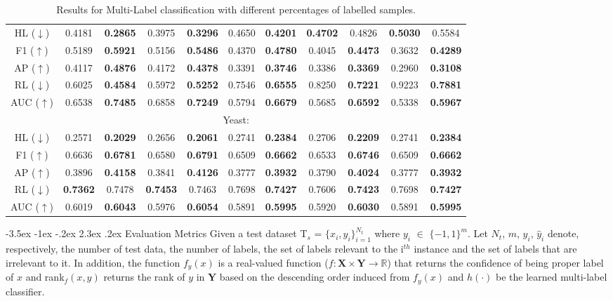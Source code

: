 \documentclass[12pt,a4paper,oneside,english]{report}
\makeatletter
\renewcommand\subsection{\@startsection {subsection}{1}{\z@}%
                                   {-3.5ex \@plus -1ex \@minus -.2ex}%
                                   {2.3ex \@plus.2ex}%
                                   {\centering\normalfont\Large\bfseries}}
\makeatother
\begin{document}
\begin{table}[htbp]
\begin{tabular}{|c|cc|cc|cc|cc|cc|}
\hline
HL ($\downarrow$) & 0.4181 & \textbf{0.2865} & 0.3975 & \textbf{0.3296} & 0.4650 & \textbf{0.4201} & \textbf{0.4702} & 0.4826 & \textbf{0.5030} & 0.5584 \\
F1 ($\uparrow$) & 0.5189 & \textbf{0.5921} & 0.5156 & \textbf{0.5486} & 0.4370 & \textbf{0.4780} & 0.4045 & \textbf{0.4473} & 0.3632 & \textbf{0.4289} \\
AP ($\uparrow$) & 0.4117 & \textbf{0.4876} & 0.4172 & \textbf{0.4378} & 0.3391 & \textbf{0.3746} & 0.3386 & \textbf{0.3369} & 0.2960 & \textbf{0.3108} \\
RL ($\downarrow$) & 0.6025 & \textbf{0.4584} & 0.5972 & \textbf{0.5252} & 0.7546 & \textbf{0.6555} & 0.8250 & \textbf{0.7221} & 0.9223 & \textbf{0.7881} \\
AUC ($\uparrow$) & 0.6538 & \textbf{0.7485} & 0.6858 & \textbf{0.7249} & 0.5794 & \textbf{0.6679} & 0.5685 & \textbf{0.6592} & 0.5338 & \textbf{0.5967} \\ 
\hline
\multicolumn{11}{|c|}{Yeast:} \\ 
\hline
HL ($\downarrow$) & 0.2571 & \textbf{0.2029} & 0.2656 & \textbf{0.2061} & 0.2741 & \textbf{0.2384} & 0.2706 & \textbf{0.2209} & 0.2741 & \textbf{0.2384} \\
F1 ($\uparrow$) & 0.6636 & \textbf{0.6781} & 0.6580 & \textbf{0.6791} & 0.6509 & \textbf{0.6662} & 0.6533 & \textbf{0.6746} & 0.6509 & \textbf{0.6662} \\
AP ($\uparrow$) & 0.3896 & \textbf{0.4158} & 0.3841 & \textbf{0.4126} & 0.3777 & \textbf{0.3932} & 0.3790 & \textbf{0.4024} & 0.3777 & \textbf{0.3932} \\
RL ($\downarrow$) & \textbf{0.7362} & 0.7478 & \textbf{0.7453} & 0.7463 & 0.7698 & \textbf{0.7427} & 0.7606 & \textbf{0.7423} & 0.7698 & \textbf{0.7427} \\
AUC ($\uparrow$) & 0.6019 & \textbf{0.6043} & 0.5976 & \textbf{0.6054} & 0.5891 & \textbf{0.5995} & 0.5920 & \textbf{0.6030} & 0.5891 & \textbf{0.5995} \\ 
\hline
\end{tabular}
\caption{Results for Multi-Label classification with different percentages of labelled samples.}
\label{tab:multi_label_results}
\end{table}
 
\subsection{Evaluation Metrics}
\label{Evaluation Metrics}
Given a test dataset T$_{s}$ = $\lbrace x_{i},y_{i} \rbrace_{i=1}^{N_{t}}$ where $y_{i}$ $\in$ $\lbrace{-1,1}\rbrace^{m}$. Let $N_{t}$, $m$, $y_{i}$, $\hat{y}_{i}$ denote, respectively, the number of test data, the number of labels, the set of labels relevant to the i$^{th}$ instance and the set of labels that are irrelevant to it.  In addition, the function  $f_{y}(x)$ is a real-valued function ($f : \textbf{X} \times \textbf{Y} \rightarrow \mathbb{R}$) that returns the confidence of being proper label of $x$ and rank$_{f}(x,y)$  returns the rank of $y$ in $\textbf{Y}$ based on the descending order induced from $f_{y}(x)$ and $h(\cdot)$ be the learned multi-label classifier.
\end{document}
